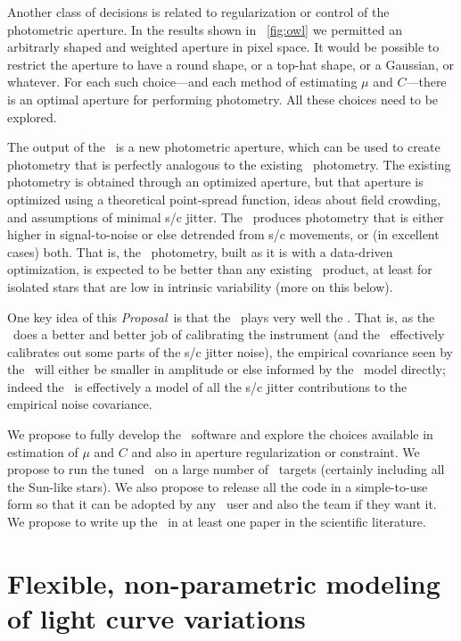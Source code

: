 \documentclass[letterpaper,12pt,preprint]{hack_aastex}
\newcommand{\documentname}{\textsl{Proposal}}
\begin{document}
Another class of decisions is related to regularization or control of the
photometric aperture.
In the results shown in \figurename~\ref{fig:owl} we permitted an arbitrarly
shaped and weighted aperture in pixel space.
It would be possible to restrict the aperture to have a round shape, or a
top-hat shape, or a Gaussian, or whatever.
For each such choice---and each method of estimating $\mu$ and $C$---there is
an optimal aperture for performing photometry.
All these choices need to be explored.

The output of the \OWL\ is a new photometric aperture, which can be used to
create photometry that is perfectly analogous to the existing \Kepler\
photometry.
The existing photometry is obtained through an optimized aperture, but that
aperture is optimized using a theoretical point-spread function, ideas about
field crowding, and assumptions of minimal s/c jitter.
The \OWL\ produces photometry that is either higher in signal-to-noise or else
detrended from s/c movements, or (in excellent cases) both.
That is, the \OWL\ photometry, built as it is with a data-driven optimization,
is expected to be better than any existing \Kepler\ product,
at least for isolated stars that are low in intrinsic variability
(more on this below).

One key idea of this \documentname\ is that the \OWL\ plays very well the \PLM.
That is, as the \PLM\ does a better and better job of calibrating the
instrument (and the \PLM\ effectively calibrates out some parts of the s/c
jitter noise), the empirical covariance seen by the \OWL\ will either be
smaller in amplitude or else informed by the \PLM\ model directly;
indeed the \PLM\ is effectively a model of all the s/c jitter contributions to
the empirical noise covariance.

We propose to fully develop the \OWL\ software and explore the choices available
in estimation of $\mu$ and $C$ and also in aperture regularization or
constraint.
We propose to run the tuned \OWL\ on a large number of \Kepler\ targets
(certainly including all the Sun-like stars).
We also propose to release all the code in a simple-to-use form so that it
can be adopted by any \Kepler\ user and also the \project{K2} team if they
want it.
We propose to write up the \OWL\ in at least one paper in the scientific
literature.

\section{Flexible, non-parametric modeling of light curve variations}
\end{document}
